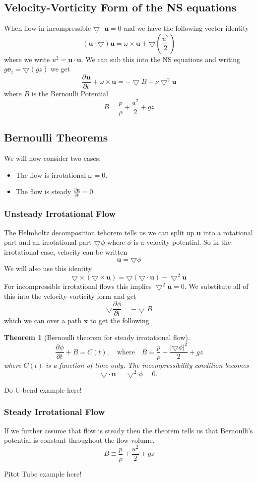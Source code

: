 \documentclass[11pt]{article}
\newcommand*{\pd}[3][]{\ensuremath{\frac{\partial^{#1} {#2}}{\partial {#3}^{#1}}}}
\newcommand{\grad}{\bigtriangledown}
\newcommand{\mv}[1]{\textbf{#1}}
\newcommand{\mdf}[1]{{\color{red}#1}}
\newcommand{\abs}[1]{|#1|}
\newtheorem{theorem}{Theorem}[section]
\newenvironment{eg}
    {\begin{mdframed}[backgroundcolor=mylg, roundcorner=5pt, linewidth=0pt]}
    {\end{mdframed}}
\begin{document}
\subsection{Velocity-Vorticity Form of the NS equations}
When flow in incompressible $\grad\cdot\mv{u}=0$ and we have the following vector identity
$$(\mv{u}\cdot\grad)\mv{u}=\omega\times\mv{u}+\grad\left(\frac{u^2}{2}\right)$$
where we write $u^2=\mv{u}\cdot\mv{u}$. We can sub this into the NS equations and writing $g\mv{e}_z=\grad(gz)$ we get
$$\pd{\mv{u}}{t}+\omega\times\mv{u}=-\grad B+\nu\grad^2\mv{u}$$
where $B$ is the \mdf{Bernoulli Potential}
$$B=\frac{p}{\rho}+\frac{u^2}{2}+gz$$
\subsection{Bernoulli Theorems}
We will now consider two cases:
\begin{itemize}
	\item The flow is irrotational $\omega = 0$.
	\item The flow is steady $\pd{\mv{u}}{t}=0$.
\end{itemize}
\subsubsection{Unsteady Irrotational Flow}
The Helmholtz decomposition tehorem tells us we can split up $\mv{u}$ into a rotational part and an irrotational part $\grad\phi$ where $\phi$ is a velocity potential. So in the irrotational case, velocity can be written
$$\mv{u}=\grad\phi$$
We will also use this identity
$$\grad\times(\grad\times\mv{u})=\grad(\grad\cdot\mv{u})-\grad^2\mv{u}$$
For incompressible irrotational flows this implies $\grad^2\mv{u}=0$.
We substitute all of this into the velocity-vorticity form and get
$$\grad\pd{\phi}{t}=-\grad B$$
which we can over a path $\mv{x}$ to get the following
\begin{theorem}[Bernoulli theorem for steady irrotational flow]
	$$\pd{\phi}{t}+B=C(t), \quad \text{where} \quad B=\frac{p}{\rho}+\frac{\abs{\grad\phi}^2}{2}+gz$$
	where $C(t)$ is a function of time only. The incompressibility condition becomes
	$$\grad\cdot\mv{u}=\grad^2\phi=0.$$
\end{theorem}

\begin{eg}
Do U-bend example here!
\end{eg}

\subsubsection{Steady Irrotational Flow}
If we further assume that flow is steady then the theorem tells us that Bernoulli's potential is constant throughout the flow volume.
$$B\equiv \frac{p}{\rho}+\frac{u^2}{2}+gz$$
\begin{eg}
Pitot Tube example here!
\end{eg}
\end{document}
